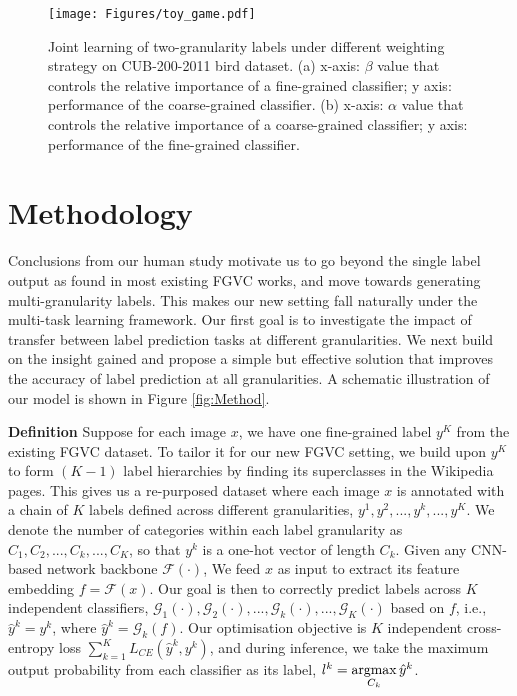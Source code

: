 \documentclass[final]{cvpr}
\DeclareMathOperator*{\argmax}{argmax}
\newcommand{\keypoint}[1]{\vspace{0.05cm}\noindent\textbf{#1}\quad}
\begin{document}
\begin{figure*}[t]
\begin{center}
\texttt{[image: Figures/toy\_game.pdf]}
\end{center}

  \caption{Joint learning of two-granularity labels under different weighting strategy on CUB-200-2011 bird dataset. (a) x-axis: $\beta$ value that controls the relative importance of a fine-grained classifier; y axis: performance of the coarse-grained classifier. (b) x-axis: $\alpha$ value that controls the relative importance of a coarse-grained classifier; y axis: performance of the fine-grained classifier.}

\label{fig:toy_game}
\end{figure*}


\section{Methodology}

Conclusions from our human study motivate us to go beyond the single label output as found in most existing FGVC works, and move towards generating multi-granularity labels. This makes our new setting fall naturally under the multi-task learning framework. Our first goal is to investigate the impact of transfer between label prediction tasks at different granularities. We next build on the insight gained and propose a simple but effective solution that improves the accuracy of label prediction at all granularities. A schematic illustration of our model is shown in Figure \ref{fig:Method}.

\keypoint{Definition} Suppose for each image $x$, we have one fine-grained label $y^K$ from the existing FGVC dataset. To tailor it for our new FGVC setting, we build upon $y^K$ to form $(K-1)$ label hierarchies by finding its superclasses in the Wikipedia pages. This gives us a re-purposed dataset where each image $x$ is annotated with a chain of $K$ labels defined across different granularities, $y^1, y^2, ..., y^k, ...,y^K$. We denote the number of categories within each label granularity as $C_1, C_2, ..., C_k, ... , C_K$, so that $y^k$ is a one-hot vector of length $C_k$. Given any CNN-based network backbone $\mathcal{F}(\cdot)$, We feed $x$ as input to extract its feature embedding {$f=\mathcal{F}(x)$}. Our goal is then to correctly predict labels across $K$ independent classifiers, $\mathcal{G}_1(\cdot), \mathcal{G}_2(\cdot), ..., \mathcal{G}_k(\cdot), ..., \mathcal{G}_K(\cdot)$ based on $f$, i.e., $\hat{y}^k = y^k$, where $\hat{y}^k=\mathcal{G}_k(f)$. Our optimisation objective is $K$ independent cross-entropy loss $\sum_{k=1}^{K}L_{CE}(\hat{y}^k, y^{k})$, and during inference, we take the maximum output probability from each classifier as its label, $l^k=\argmax\limits_{C_{\fred{k}}}\hat{y}^k$.
\end{document}
